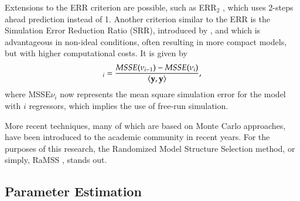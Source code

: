 Extensions to the ERR criterion are possible, such as ERR$_2$ \citep{alves2012}, which uses 2-steps ahead prediction instead of 1.
Another criterion similar to the ERR is the Simulation Error Reduction Ratio (SRR), introduced by \citep{piroddi2003}, and which is advantageous in non-ideal conditions, often resulting in more compact models, but with higher computational costs. It is given by
\begin{equation}
   [\text{SRR}]_i  = \frac{MSSE(\nu_{i-1})-MSSE(\nu_i)}{\langle\vy,\vy\rangle}
   \label{eq:SRR},
\end{equation}
where MSSE$\nu_i$ now represents the mean square simulation error for the model with $i$ regressors, which implies the use of free-run simulation.

More recent techniques, many of which are based on Monte Carlo approaches, have been introduced to the academic community in recent years. For the purposes of this research, the Randomized Model Structure Selection method, or simply, RaMSS \citep{falsone2014,falsone2015}, stands out.




\subsection{Parameter Estimation}%
\label{sec:parest}

